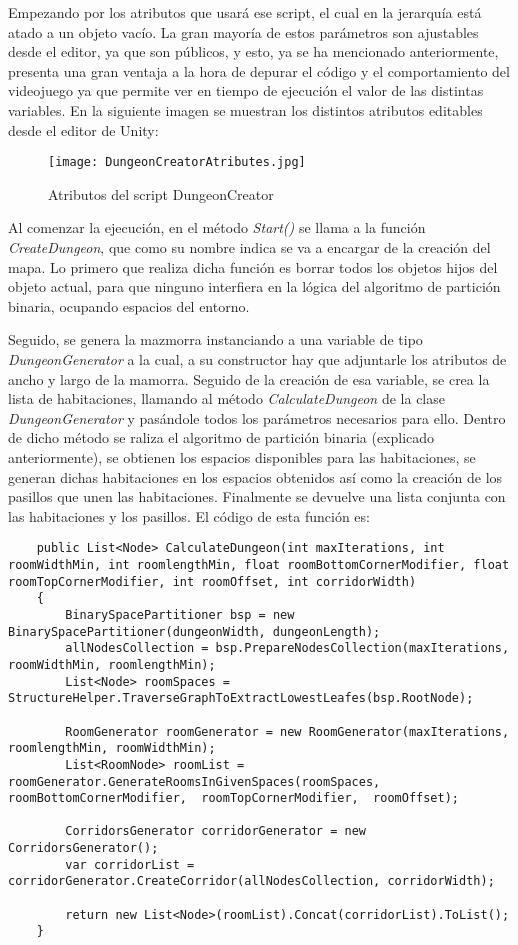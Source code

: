 Empezando por los atributos que usará ese script, el cual en la jerarquía está atado a un objeto vacío. La gran mayoría de estos parámetros son ajustables desde el editor, ya que son públicos, y esto, ya se ha mencionado anteriormente, presenta una gran ventaja a la hora de depurar el código y el comportamiento del videojuego ya que permite ver en tiempo de ejecución el valor de las distintas variables. En la siguiente imagen se muestran los distintos atributos editables desde el editor de Unity: 

\begin{figure}[H]
    \centering
    \texttt{[image: DungeonCreatorAtributes.jpg]}
    \caption{Atributos del script DungeonCreator}
\end{figure}

Al comenzar la ejecución, en el método \textit{Start()} se llama a la función \textit{CreateDungeon}, que como su nombre indica se va a encargar de la creación del mapa. Lo primero que realiza dicha función es borrar todos los objetos hijos del objeto actual, para que ninguno interfiera en la lógica del algoritmo de partición binaria, ocupando espacios del entorno. 

Seguido, se genera la mazmorra instanciando a una variable de tipo \textit{DungeonGenerator} a la cual, a su constructor hay que adjuntarle los atributos de ancho y largo de la mamorra. Seguido de la creación de esa variable, se crea la lista de habitaciones, llamando al método \textit{CalculateDungeon} de la clase \textit{DungeonGenerator} y pasándole todos los parámetros necesarios para ello. Dentro de dicho método se raliza el algoritmo de partición binaria (explicado anteriormente), se obtienen los espacios disponibles para las habitaciones, se generan dichas habitaciones en los espacios obtenidos así como la creación de los pasillos que unen las habitaciones. Finalmente se devuelve una lista conjunta con las habitaciones y los pasillos. El código de esta función es:

\begin{lstlisting}
    public List<Node> CalculateDungeon(int maxIterations, int roomWidthMin, int roomlengthMin, float roomBottomCornerModifier, float roomTopCornerModifier, int roomOffset, int corridorWidth)
    {
        BinarySpacePartitioner bsp = new BinarySpacePartitioner(dungeonWidth, dungeonLength);
        allNodesCollection = bsp.PrepareNodesCollection(maxIterations, roomWidthMin, roomlengthMin);
        List<Node> roomSpaces = StructureHelper.TraverseGraphToExtractLowestLeafes(bsp.RootNode);

        RoomGenerator roomGenerator = new RoomGenerator(maxIterations, roomlengthMin, roomWidthMin);
        List<RoomNode> roomList = roomGenerator.GenerateRoomsInGivenSpaces(roomSpaces,  roomBottomCornerModifier,  roomTopCornerModifier,  roomOffset);

        CorridorsGenerator corridorGenerator = new CorridorsGenerator();
        var corridorList = corridorGenerator.CreateCorridor(allNodesCollection, corridorWidth);

        return new List<Node>(roomList).Concat(corridorList).ToList();
    }
\end{lstlisting}

